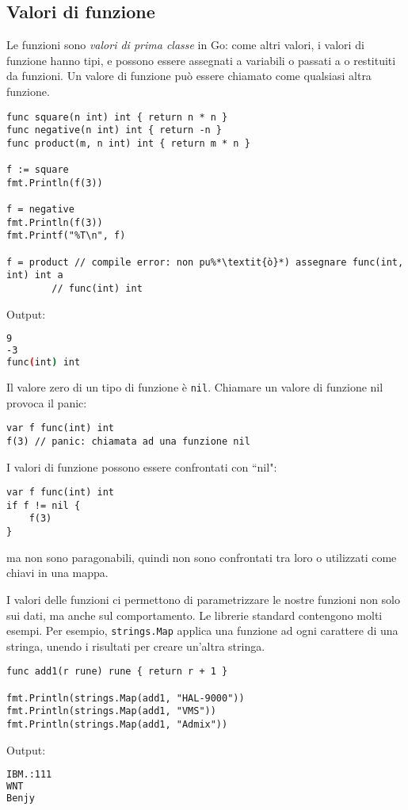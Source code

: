 \documentclass[../../thesis.tex]{subfiles}
\begin{document}
    \subsection{Valori di funzione}\label{subsec:valori-di-funzione}
    Le funzioni sono \textit{valori di prima classe} in Go: come altri valori, i valori di funzione hanno tipi, e possono essere assegnati a variabili o passati a o restituiti da funzioni.
    Un valore di funzione può essere chiamato come qualsiasi altra funzione.
    \begin{lstlisting}[frame = single,label={lst:lstlisting4-5.1}]
func square(n int) int { return n * n }
func negative(n int) int { return -n }
func product(m, n int) int { return m * n }

f := square
fmt.Println(f(3))

f = negative
fmt.Println(f(3))
fmt.Printf("%T\n", f)

f = product // compile error: non pu%*\textit{ò}*) assegnare func(int, int) int a
	    // func(int) int
    \end{lstlisting}
    Output:
    \begin{lstlisting}[language = bash, frame = L,label={lst:lstlisting4-5.2}]
9
-3
func(int) int
    \end{lstlisting}
    Il valore zero di un tipo di funzione è \verb"nil".
    Chiamare un valore di funzione nil provoca il panic:
    \begin{lstlisting}[frame = single,label={lst:lstlisting4-5.3}]
var f func(int) int
f(3) // panic: chiamata ad una funzione nil
    \end{lstlisting}
    I valori di funzione possono essere confrontati con ``nil":
    \begin{lstlisting}[frame = single,label={lst:lstlisting4-5.4}]
var f func(int) int
if f != nil {
    f(3)
}
    \end{lstlisting}
    ma non sono paragonabili, quindi non sono confrontati tra loro o utilizzati come chiavi in una mappa.
    \hfill \vspace{12pt}

    I valori delle funzioni ci permettono di parametrizzare le nostre funzioni non solo sui dati, ma anche sul comportamento.
    Le librerie standard contengono molti esempi.
    Per esempio, \verb"strings.Map" applica una funzione ad ogni carattere di una stringa, unendo i risultati per creare un'altra stringa.
    \begin{lstlisting}[frame = single,label={lst:lstlisting4-5.5}]
func add1(r rune) rune { return r + 1 }

fmt.Println(strings.Map(add1, "HAL-9000"))
fmt.Println(strings.Map(add1, "VMS"))
fmt.Println(strings.Map(add1, "Admix"))
    \end{lstlisting}
    Output:
    \begin{lstlisting}[language = bash, frame = L,label={lst:lstlisting4-5.6}]
IBM.:111
WNT
Benjy
    \end{lstlisting}
\end{document}
